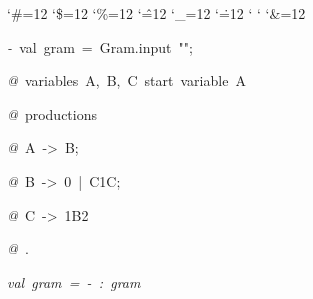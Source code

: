 \begin{list}{}
{\setlength{\leftmargin}{\leftmargini}
\setlength{\rightmargin}{0cm}
\setlength{\itemindent}{0cm}
\setlength{\listparindent}{0cm}
\setlength{\itemsep}{0cm}
\setlength{\parsep}{0cm}
\setlength{\labelsep}{0cm}
\setlength{\labelwidth}{0cm}
\catcode`\#=12
\catcode`\$=12
\catcode`\%=12
\catcode`\^=12
\catcode`\_=12
\catcode`\.=12
\catcode`
\catcode`
\catcode`\&=12
\ttfamily}
\small
\item[]\textsl{-\ }val\ gram\ =\ Gram.input\ "";
\item[]\textsl{@\ }variables\ A,\ B,\ C\ start\ variable\ A
\item[]\textsl{@\ }productions
\item[]\textsl{@\ }A\ ->\ B;
\item[]\textsl{@\ }B\ ->\ 0\ |\ C1C;
\item[]\textsl{@\ }C\ ->\ 1B2
\item[]\textsl{@\ }.
\item[]\textsl{val\ gram\ =\ -\ :\ gram}
\end{list}
